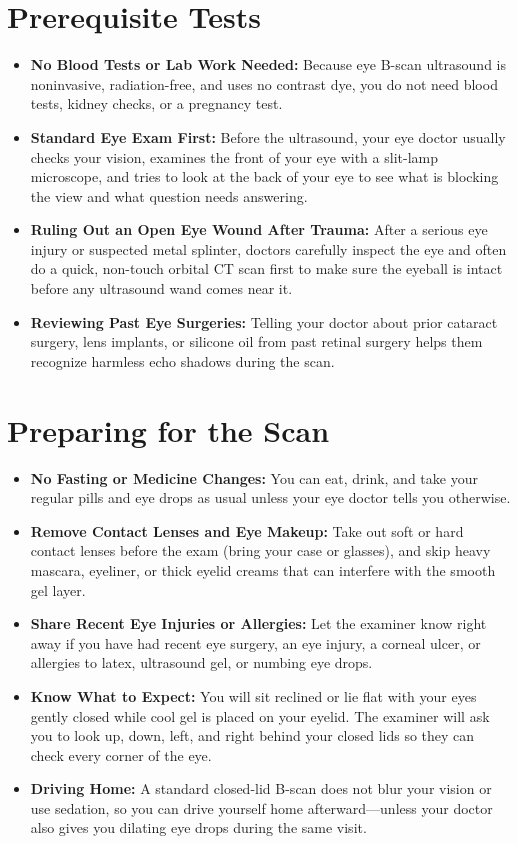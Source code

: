 \section{Prerequisite Tests}
\begin{itemize}
    \item \textbf{No Blood Tests or Lab Work Needed:} Because eye B-scan ultrasound is noninvasive, radiation-free, and uses no contrast dye, you do not need blood tests, kidney checks, or a pregnancy test.
    \item \textbf{Standard Eye Exam First:} Before the ultrasound, your eye doctor usually checks your vision, examines the front of your eye with a slit-lamp microscope, and tries to look at the back of your eye to see what is blocking the view and what question needs answering.
    \item \textbf{Ruling Out an Open Eye Wound After Trauma:} After a serious eye injury or suspected metal splinter, doctors carefully inspect the eye and often do a quick, non-touch orbital CT scan first to make sure the eyeball is intact before any ultrasound wand comes near it.
    \item \textbf{Reviewing Past Eye Surgeries:} Telling your doctor about prior cataract surgery, lens implants, or silicone oil from past retinal surgery helps them recognize harmless echo shadows during the scan.
\end{itemize}

\section{Preparing for the Scan}
\begin{itemize}
    \item \textbf{No Fasting or Medicine Changes:} You can eat, drink, and take your regular pills and eye drops as usual unless your eye doctor tells you otherwise.
    \item \textbf{Remove Contact Lenses and Eye Makeup:} Take out soft or hard contact lenses before the exam (bring your case or glasses), and skip heavy mascara, eyeliner, or thick eyelid creams that can interfere with the smooth gel layer.
    \item \textbf{Share Recent Eye Injuries or Allergies:} Let the examiner know right away if you have had recent eye surgery, an eye injury, a corneal ulcer, or allergies to latex, ultrasound gel, or numbing eye drops.
    \item \textbf{Know What to Expect:} You will sit reclined or lie flat with your eyes gently closed while cool gel is placed on your eyelid. The examiner will ask you to look up, down, left, and right behind your closed lids so they can check every corner of the eye.
    \item \textbf{Driving Home:} A standard closed-lid B-scan does not blur your vision or use sedation, so you can drive yourself home afterward---unless your doctor also gives you dilating eye drops during the same visit.
\end{itemize}

